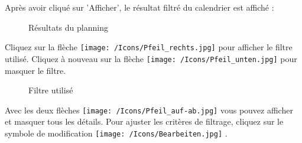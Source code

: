 \vspace{\baselineskip}
\vspace{\baselineskip}

Après avoir cliqué sur 'Afficher', le résultat filtré du calendrier est affiché :

\begin{figure}[H]
\caption{Résultats du planning}
\end{figure}

Cliquez sur la flèche \texttt{[image: /Icons/Pfeil\_rechts.jpg]}  pour afficher le filtre utilisé. Cliquez à nouveau sur la flèche \texttt{[image: /Icons/Pfeil\_unten.jpg]}  pour masquer le filtre.

\begin{figure}[H]
\caption{Filtre utilisé}
\end{figure}

Avec les deux flèches \texttt{[image: /Icons/Pfeil\_auf-ab.jpg]}  vous pouvez afficher et masquer tous les détails. Pour ajuster les critères de filtrage, cliquez sur le symbole de modification \texttt{[image: /Icons/Bearbeiten.jpg]} .
